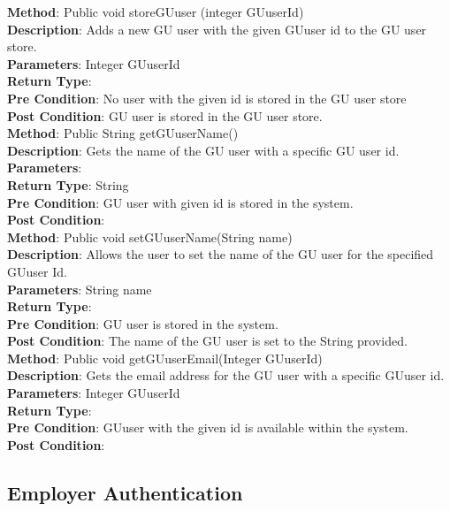 \documentclass{l3deliverable}
\begin{document}
\textbf{Method}: Public void storeGUuser (integer GUuserId)\\
\textbf{Description}: Adds a new GU user with the given GUuser id to the GU user store.\\
\textbf{Parameters}: Integer GUuserId\\
\textbf{Return Type}:\\
\textbf{Pre Condition}: No user with the given id is stored in the GU user store\\
\textbf{Post Condition}: GU user is stored in the GU user store.\\

\textbf{Method}: Public String getGUuserName()\\
\textbf{Description}: Gets the name of the GU user with a specific GU user id.\\
\textbf{Parameters}:\\
\textbf{Return Type}: String\\
\textbf{Pre Condition}: GU user with given id is stored in the system.\\
\textbf{Post Condition}:\\

\textbf{Method}: Public void setGUuserName(String name)\\
\textbf{Description}: Allows the user to set the name of the GU user for the specified GUuser Id.\\
\textbf{Parameters}: String name\\
\textbf{Return Type}:\\
\textbf{Pre Condition}: GU user is stored in the system.\\
\textbf{Post Condition}: The name of the GU user is set to the String provided.\\

\textbf{Method}: Public void getGUuserEmail(Integer GUuserId)\\
\textbf{Description}: Gets the email address for the GU user with a specific GUuser id.\\
\textbf{Parameters}: Integer GUuserId\\
\textbf{Return Type}:\\
\textbf{Pre Condition}: GUuser with the given id is available within the system.\\
\textbf{Post Condition}:\\

\subsection{Employer Authentication}
\end{document}
